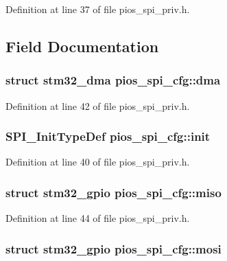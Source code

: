 \-Definition at line 37 of file pios\-\_\-spi\-\_\-priv.\-h.



\subsection{\-Field \-Documentation}
\hypertarget{structpios__spi__cfg_a2facc0b31de6aa6a377366b1d1dfa30f}{
\subsubsection[{dma}]{\setlength{\rightskip}{0pt plus 5cm}struct {\bf stm32\-\_\-dma} {\bf pios\-\_\-spi\-\_\-cfg\-::dma}}}\label{structpios__spi__cfg_a2facc0b31de6aa6a377366b1d1dfa30f}


\-Definition at line 42 of file pios\-\_\-spi\-\_\-priv.\-h.

\hypertarget{structpios__spi__cfg_adbc1199b6671cd7ab6856b5d76038020}{
\subsubsection[{init}]{\setlength{\rightskip}{0pt plus 5cm}\-S\-P\-I\-\_\-\-Init\-Type\-Def {\bf pios\-\_\-spi\-\_\-cfg\-::init}}}\label{structpios__spi__cfg_adbc1199b6671cd7ab6856b5d76038020}


\-Definition at line 40 of file pios\-\_\-spi\-\_\-priv.\-h.

\hypertarget{structpios__spi__cfg_ac804df72ee895e7482167ac5452b31aa}{
\subsubsection[{miso}]{\setlength{\rightskip}{0pt plus 5cm}struct {\bf stm32\-\_\-gpio} {\bf pios\-\_\-spi\-\_\-cfg\-::miso}}}\label{structpios__spi__cfg_ac804df72ee895e7482167ac5452b31aa}


\-Definition at line 44 of file pios\-\_\-spi\-\_\-priv.\-h.

\hypertarget{structpios__spi__cfg_adaf88353246da685e0f82e927d72eaed}{
\subsubsection[{mosi}]{\setlength{\rightskip}{0pt plus 5cm}struct {\bf stm32\-\_\-gpio} {\bf pios\-\_\-spi\-\_\-cfg\-::mosi}}}\label{structpios__spi__cfg_adaf88353246da685e0f82e927d72eaed}


